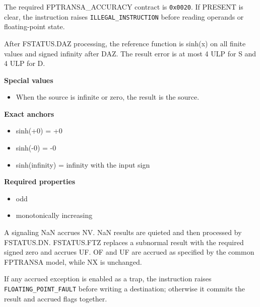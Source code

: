 The required FPTRANSA\_ACCURACY contract is \texttt{0x0020}. If PRESENT is clear, the instruction raises \texttt{ILLEGAL\_INSTRUCTION} before reading operands or floating-point state.

After FSTATUS.DAZ processing, the reference function is sinh(x) on all finite values and signed infinity after DAZ. The result error is at most 4 ULP for S and 4 ULP for D.

\textbf{Special values}\par
\begin{itemize}
\item When the source is infinite or zero, the result is the source.
\end{itemize}

\textbf{Exact anchors}\par
\begin{itemize}
\item sinh(+0) = +0
\item sinh(-0) = -0
\item sinh(infinity) = infinity with the input sign
\end{itemize}

\textbf{Required properties}\par
\begin{itemize}
\item odd
\item monotonically increasing
\end{itemize}

A signaling NaN accrues NV. NaN results are quieted and then processed by FSTATUS.DN. FSTATUS.FTZ replaces a subnormal result with the required signed zero and accrues UF. OF and UF are accrued as specified by the common FPTRANSA model, while NX is unchanged.

If any accrued exception is enabled as a trap, the instruction raises \texttt{FLOATING\_POINT\_FAULT} before writing a destination; otherwise it commits the result and accrued flags together.
